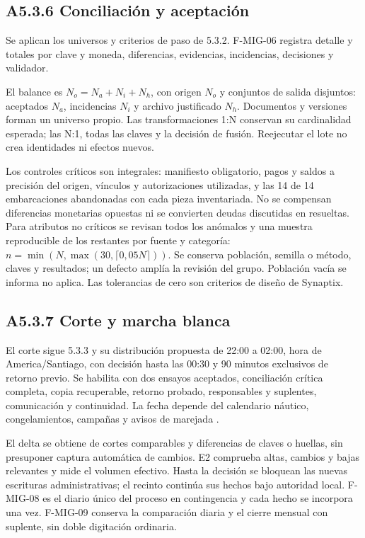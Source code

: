 \subsection*{A5.3.6 Conciliación y aceptación}

Se aplican los universos y criterios de paso de 5.3.2. F-MIG-06 registra detalle y totales por clave y moneda, diferencias, evidencias, incidencias, decisiones y validador.

El balance es \(N_o=N_a+N_i+N_h\), con origen \(N_o\) y conjuntos de salida disjuntos: aceptados \(N_a\), incidencias \(N_i\) y archivo justificado \(N_h\). Documentos y versiones forman un universo propio. Las transformaciones 1:N conservan su cardinalidad esperada; las N:1, todas las claves y la decisión de fusión. Reejecutar el lote no crea identidades ni efectos nuevos.

Los controles críticos son integrales: manifiesto obligatorio, pagos y saldos a precisión del origen, vínculos y autorizaciones utilizadas, y las 14 de 14 embarcaciones abandonadas con cada pieza inventariada. No se compensan diferencias monetarias opuestas ni se convierten deudas discutidas en resueltas. Para atributos no críticos se revisan todos los anómalos y una muestra reproducible de los restantes por fuente y categoría: \(n=\min(N,\max(30,\lceil0{,}05N\rceil))\). Se conserva población, semilla o método, claves y resultados; un defecto amplía la revisión del grupo. Población vacía se informa no aplica. Las tolerancias de cero son criterios de diseño de Synaptix.

\subsection*{A5.3.7 Corte y marcha blanca}

El corte sigue 5.3.3 y su distribución propuesta de 22:00 a 02:00, hora de America/Santiago, con decisión hasta las 00:30 y 90 minutos exclusivos de retorno previo. Se habilita con dos ensayos aceptados, conciliación crítica completa, copia recuperable, retorno probado, responsables y suplentes, comunicación y continuidad. La fecha depende del calendario náutico, congelamientos, campañas y avisos de marejada \parencites[RT-20.02--RT-20.04]{pucv-bases-transversales}[cap.~13 y RT-10.05]{pucv-caso07}.

El delta se obtiene de cortes comparables y diferencias de claves o huellas, sin presuponer captura automática de cambios. E2 comprueba altas, cambios y bajas relevantes y mide el volumen efectivo. Hasta la decisión se bloquean las nuevas escrituras administrativas; el recinto continúa sus hechos bajo autoridad local. F-MIG-08 es el diario único del proceso en contingencia y cada hecho se incorpora una vez. F-MIG-09 conserva la comparación diaria y el cierre mensual con suplente, sin doble digitación ordinaria.

